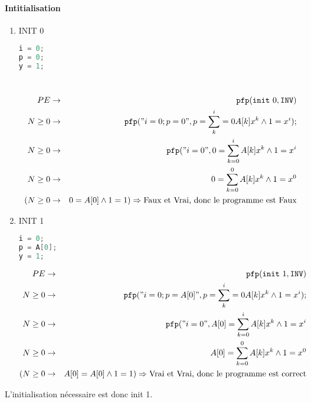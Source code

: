 \paragraph{Intitialisation}
	\begin{enumerate} 
		\item INIT 0 \begin{lstlisting}[language=C,numbers=none]
i = 0; 
p = 0; 
y = 1;
\end{lstlisting}~
\begin{eqnarray*}
	PE &\rightarrow& \pfp (\texttt{init}\ 0, \texttt{INV})\\
	N \geq 0 &\rightarrow& \pfp ("i=0;p=0", p=\sum^i_k=0 A[k]x^k \wedge 1 = x^i);\\
	N \geq 0 &\rightarrow& \pfp ("i=0", 0 = \sum^i_{k=0} A[k]x^k \wedge 1 = x^i\\
	N \geq 0 &\rightarrow& 0 = \sum^0_{k=0} A[k]x^k \wedge 1 = x^0\\
	(N \geq 0 &\rightarrow& 0 = A[0] \wedge 1 = 1) \Rightarrow \textrm{Faux et Vrai, donc le programme est Faux} \end{eqnarray*}
		\item INIT 1 \begin{lstlisting}[language=C,numbers=none]
i = 0; 
p = A[0]; 
y = 1;
\end{lstlisting}
\begin{eqnarray*}
	PE &\rightarrow& \pfp (\texttt{init}\ 1, \texttt{INV})\\
	N \geq 0 &\rightarrow& \pfp ("i=0;p=A[0]", p=\sum^i_k=0 A[k]x^k \wedge 1 = x^i);\\
	N \geq 0 &\rightarrow& \pfp ("i=0", A[0] = \sum^i_{k=0} A[k]x^k \wedge 1 = x^i\\
	N \geq 0 &\rightarrow& A[0] = \sum^0_{k=0} A[k]x^k \wedge 1 = x^0\\
	(N \geq 0 &\rightarrow& A[0] = A[0] \wedge 1 = 1) \Rightarrow \textrm{Vrai et Vrai, donc le programme est correct}
\end{eqnarray*}
\end{enumerate}
L'initialisation nécessaire est donc init 1.
